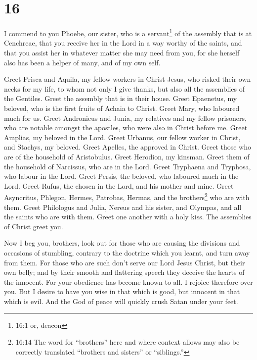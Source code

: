 \hypertarget{section-15}{%
\section{16}\label{section-15}}

 I commend to you Phoebe, our sister, who is a
servant\footnote{16:1 or, deacon} of the assembly that is at Cenchreae,
 that you receive her in the Lord in a way worthy of the
saints, and that you assist her in whatever matter she may need from
you, for she herself also has been a helper of many, and of my own self.

 Greet Prisca and Aquila, my fellow workers in Christ Jesus,
 who risked their own necks for my life, to whom not only I
give thanks, but also all the assemblies of the Gentiles. 
Greet the assembly that is in their house. Greet Epaenetus, my beloved,
who is the first fruits of Achaia to Christ.  Greet Mary,
who laboured much for us.  Greet Andronicus and Junia, my
relatives and my fellow prisoners, who are notable amongst the apostles,
who were also in Christ before me.  Greet Amplias, my
beloved in the Lord.  Greet Urbanus, our fellow worker in
Christ, and Stachys, my beloved.  Greet Apelles, the
approved in Christ. Greet those who are of the household of Aristobulus.
 Greet Herodion, my kinsman. Greet them of the household of
Narcissus, who are in the Lord.  Greet Tryphaena and
Tryphosa, who labour in the Lord. Greet Persis, the beloved, who
laboured much in the Lord.  Greet Rufus, the chosen in the
Lord, and his mother and mine.  Greet Asyncritus, Phlegon,
Hermes, Patrobas, Hermas, and the brothers\footnote{16:14 The word for
  ``brothers'' here and where context allows may also be correctly
  translated ``brothers and sisters'' or ``siblings.''} who are with
them.  Greet Philologus and Julia, Nereus and his sister,
and Olympas, and all the saints who are with them.  Greet
one another with a holy kiss. The assemblies of Christ greet you.

 Now I beg you, brothers, look out for those who are
causing the divisions and occasions of stumbling, contrary to the
doctrine which you learnt, and turn away from them.  For
those who are such don't serve our Lord Jesus Christ, but their own
belly; and by their smooth and flattering speech they deceive the hearts
of the innocent.  For your obedience has become known to
all. I rejoice therefore over you. But I desire to have you wise in that
which is good, but innocent in that which is evil.  And the
God of peace will quickly crush Satan under your feet.

